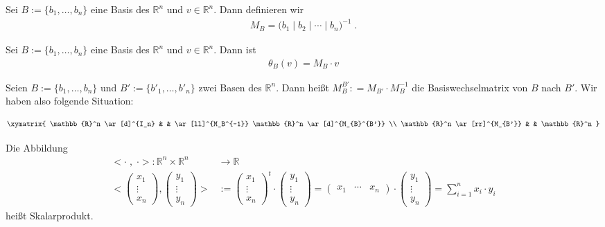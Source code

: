 \begin{Definition}
Sei $B:= \{ b_1, \hdots , b_n \}$ eine Basis des $\mathbb{R}^n$ und $v \in \mathbb{R}^n$. Dann definieren wir  
\begin{align*}
M_B  = \biggl ( b_1 \; \bigg | \;  b_2 \; \bigg | \;  \cdots  \; \bigg | \;  b_n \biggr )^{-1}   \;.
\end{align*}
\end{Definition}


\begin{Satz}
Sei $B:= \{ b_1, \hdots , b_n \}$ eine Basis des $\mathbb{R}^n$ und $v \in \mathbb{R}^n$. Dann ist 
\begin{align*}
\theta_B (v) = M_B \cdot v   
\end{align*}
\end{Satz}



\begin{Definition}
Seien $B:= \{ b_1, \hdots , b_n \}$ und $B':= \{ b'_1, \hdots , b'_n \}$ zwei Basen des $\mathbb{R}^n$.
Dann heißt $M_{B}^{B'} : = M_{B'}  \cdot M_{B}^{-1} $ die Basiswechselmatrix von $B$ nach $B'$. Wir haben also folgende Situation:

\begin{align*}
\xymatrix{
\mathbb{R}^n  \ar[d]^{I_n} &  & \ar[ll]^{M_B^{-1}} \mathbb{R}^n \ar[d]^{M_{B}^{B'}} \\
\mathbb{R}^n  \ar[rr]^{M_{B'}} & &  \mathbb{R}^n
}
\end{align*}
\end{Definition}

\begin{Definition}
Die Abbildung 
\begin{align*}
< \cdot \; , \;  \cdot > : \mathbb{R}^n \times \mathbb{R}^n & \to \mathbb{R} \\
\Biggl < \begin{pmatrix}
x_1 \\ \vdots \\ x_n
\end{pmatrix},  \begin{pmatrix}
y_1 \\ \vdots \\ y_n
\end{pmatrix}  \Biggr> & := \begin{pmatrix}
x_1 \\ \vdots \\ x_n
\end{pmatrix}^t \cdot \begin{pmatrix}
y_1 \\ \vdots \\ y_n  
\end{pmatrix}  =
\begin{pmatrix}
x_1 & \cdots & x_n
\end{pmatrix} \cdot \begin{pmatrix}
y_1 \\ \vdots \\ y_n  
\end{pmatrix} = \sum_{i=1}^n  x_i \cdot y_i
\end{align*}  
heißt Skalarprodukt.
\end{Definition}



